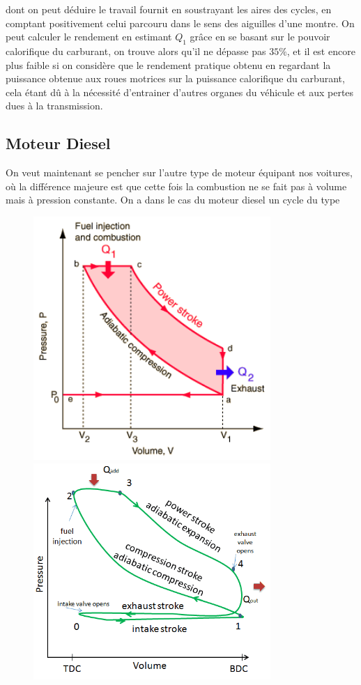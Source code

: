 \documentclass[12pt,prb,aps,epsf]{report}
\begin{document}
dont on peut déduire le travail fournit en soustrayant les aires des cycles, en comptant positivement celui parcouru dans le sens des aiguilles d'une montre. On peut calculer le rendement en estimant $Q_1$ grâce en se basant sur le pouvoir calorifique du carburant, on trouve alors qu'il ne dépasse pas $35\%$, et il est encore plus faible si on considère que le rendement pratique obtenu en regardant la puissance obtenue aux roues motrices sur la puissance calorifique du carburant, cela étant dû à la nécessité d'entrainer d'autres organes du véhicule et aux pertes dues à la transmission.


\subsection{Moteur Diesel}
On veut maintenant se pencher sur l'autre type de moteur équipant nos voitures, où la différence majeure est que cette fois la combustion ne se fait pas à volume mais à pression constante.
On a dans le cas du moteur diesel un cycle du type 
\begin{figure}[h]
	\centerline {\includegraphics[width=9cm]{cycle_diesel}
				\includegraphics[width=9cm]{cycle_diesel_reel}}
\end{figure} 
\end{document}
